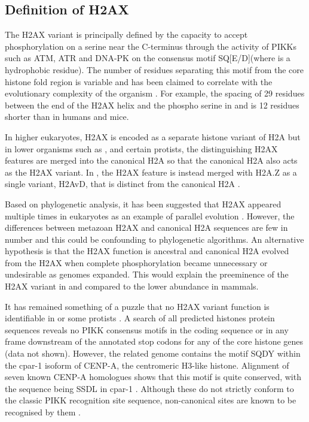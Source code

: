 \subsection{Definition of H2AX}
\label{subsec:h2ax-review:relation-H2A-H2AX}
The H2AX variant is principally defined by the capacity to accept
phosphorylation on a serine near the C-terminus through the activity
of PIKKs such as ATM, ATR and DNA-PK on the consensus motif
SQ[E/D]\textPhi (where \textPhi is a hydrophobic residue). The number
of residues separating this motif from the core histone fold region is
variable and has been claimed to correlate with the evolutionary
complexity of the organism \citep{CRDP+02}. For example, the spacing
of 29 residues between the end of the H2AX  helix and the
phospho serine in  and
 is 12 residues shorter than in humans and
mice.

In higher eukaryotes, H2AX is encoded as a separate histone variant of
H2A but in lower organisms such as ,
 and certain protists, the distinguishing H2AX
features are merged into the canonical H2A \citep{HSM03,SJN06} so that
the canonical H2A also acts as the H2AX variant. In
, the H2AX feature is instead merged
with H2A.Z as a single variant, H2AvD, that is distinct from the
canonical H2A \citep{MCG02}.

Based on phylogenetic analysis, it has been suggested that H2AX
appeared multiple times in eukaryotes as an example of parallel
evolution \citep{HSM03}. However, the differences between metazoan
H2AX and canonical H2A sequences are few in number and this could be
confounding to phylogenetic algorithms. An alternative hypothesis is
that the H2AX function is ancestral and canonical H2A evolved from the
H2AX when complete phosphorylation became unnecessary or undesirable
as genomes expanded. This would explain the preeminence of the H2AX
variant in  and  compared
to the lower abundance in mammals.

It has remained something of a puzzle that no H2AX variant function is
identifiable in  \citep{HSM03} or some
protists \citep{SJN06}. A search of all predicted
 histones protein sequences reveals no PIKK
consensus motifs in the coding sequence or in any frame downstream of
the annotated stop codons for any of the core histone genes (data not
shown). However, the related  genome contains
the motif SQDY within the \mbox{cpar-1} isoform of \mbox{CENP-A},
the centromeric \mbox{H3-like} histone. Alignment of seven known
 \mbox{CENP-A} homologues shows that this
motif is quite conserved, with the sequence being SSDL in
 \mbox{cpar-1}
. Although these do not strictly
conform to the classic PIKK recognition site sequence, non-canonical
sites are known to be recognised by them \citep{SYC+05}.

